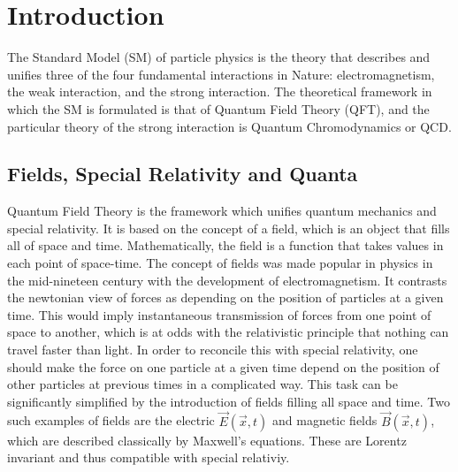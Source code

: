 \chapter{Introduction}%


\label{ch_introduction}


The Standard Model (SM) of particle physics is the theory that describes and unifies three of the four fundamental interactions in Nature: electromagnetism, the weak interaction, and the strong interaction. The theoretical framework in which the SM is formulated is that of Quantum Field Theory (QFT), and the particular theory of the strong interaction is Quantum Chromodynamics or QCD.

\section{Fields, Special Relativity and Quanta}

Quantum Field Theory is the framework which unifies quantum mechanics and special relativity. It is based on the concept of a field, which is an object that fills all of space and time. Mathematically, the field is a function that takes values in each point of space-time. The concept of fields was made popular in physics in the mid-nineteen century with the development of electromagnetism. It contrasts the newtonian view of forces as depending on the position of particles at a given time. This would imply instantaneous transmission of forces from one point of space to another, which is at odds with the relativistic principle that nothing can travel faster than light. In order to reconcile this with special relativity, one should make the force on one particle at a given time depend on the position of other particles at previous times in a complicated way. This task can be significantly simplified by the introduction of fields filling all space and time. Two such examples of fields are the electric $\vec{E}(\vec{x},t)$ and magnetic fields $\vec{B}(\vec{x},t)$, which are described classically by Maxwell's equations. These are Lorentz invariant and thus compatible with special relativiy.

